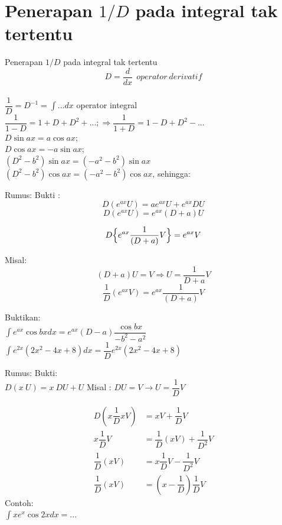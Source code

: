 \documentclass{beamer}
\begin{document}
\section{Penerapan $1/D$ pada integral tak tertentu}
\begin{frame}[t, fragile]{Penerapan $1/D$ pada integral tak tertentu}
$$D= \dfrac{d}{dx}~~operator~ derivatif$$ \\
$\dfrac{1}{D} = D^{-1} = \int ... dx$ operator integral\\
$\dfrac{1}{1-D}=1 + D+ D^2+ ...; \Longrightarrow \dfrac{1}{1+D} = 1 - D + D^2-...$\\
\vskip5pt
$D \sin ax = a \cos ax$;  \\
$D \cos ax = -a \sin ax$;  \\
\vskip5pt
$(D^2-b^2) \sin ax = (-a^2 - b^2) \sin ax$\\
$(D^2-b^2) \cos ax = (-a^2 - b^2) \cos ax$, sehingga:\\
\begin{center}
\end{center}
\end{frame}

\begin{frame}[t, fragile]{Rumus: }
Bukti :
$$D(e^{ax} U) = ae^{ax} U + e^{ax} DU$$
$$D(e^{ax} U) = e^{ax}(D + a) U$$ 

$$D\Bigl\{e^{ax}\dfrac{1}{(D+a)}V\Bigr\} = e^{ax} V$$

Misal:
$$(D+a) U = V \Longrightarrow U = \dfrac{1}{D+a} V$$
$$\dfrac{1}{D}(e^{ax}V)= e^{ax}\dfrac{1}{(D+a)} V$$

Buktikan:\\
$\int e^{ax}\cos{bx} dx=e^{ax}(D-a)\dfrac{\cos{bx}}{-b^2-a^2}$
$\int e^{2x}(2x^2-4x+8)dx = \dfrac{1}{D}e^{2x}(2x^2-4x+8)$

\end{frame}

\begin{frame}[t, fragile]{Rumus: }
Bukti:\\
$D(x~U) = x ~DU + U$      Misal : $DU = V \rightarrow U= \dfrac{1}{D}V$

\begin{align*}
D(x \dfrac{1}{D}xV) &= x V + \dfrac{1}{D}V \\
x\dfrac{1}{D}V &= \dfrac{1}{D} (x V) + \dfrac{1}{D^2}V\\
\dfrac{1}{D} (x V) &= x \dfrac{1}{D}V - \dfrac{1}{D^2} V \\
\dfrac{1}{D} (x V) &= (x -\dfrac{1}{D}) \dfrac{1}{D} V
\end{align*}
Contoh:\\
$\int x e^x \cos 2x dx=...$
\end{frame}
\end{document}
